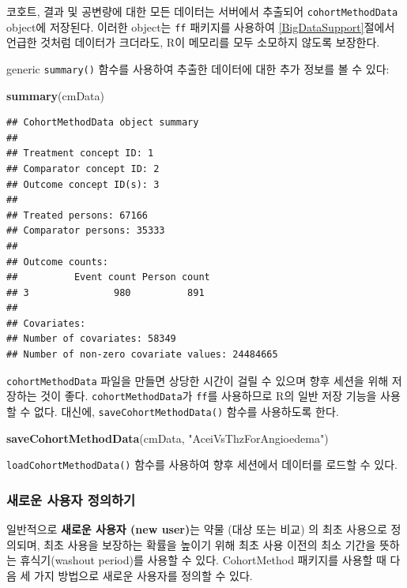 \documentclass[11pt]{book}
\newenvironment{Shaded}{\begin{snugshade}}{\end{snugshade}}
\newcommand{\KeywordTok}[1]{\textcolor[rgb]{0.13,0.29,0.53}{\textbf{#1}}}
\newcommand{\StringTok}[1]{\textcolor[rgb]{0.31,0.60,0.02}{#1}}
\newcommand{\NormalTok}[1]{#1}
\theoremstyle{definition}
\theoremstyle{definition}
\theoremstyle{definition}
\theoremstyle{remark}
\begin{document}
코호트, 결과 및 공변량에 대한 모든 데이터는 서버에서 추출되어
\texttt{cohortMethodData} object에 저장된다. 이러한 object는 \texttt{ff}
패키지를 사용하여 \ref{BigDataSupport}절에서 언급한 것처럼 데이터가
크더라도, R이 메모리를 모두 소모하지 않도록 보장한다.

generic \texttt{summary()} 함수를 사용하여 추출한 데이터에 대한 추가
정보를 볼 수 있다:

\begin{Shaded}
\begin{Highlighting}[]
\KeywordTok{summary}\NormalTok{(cmData)}
\end{Highlighting}
\end{Shaded}

\begin{verbatim}
## CohortMethodData object summary
## 
## Treatment concept ID: 1
## Comparator concept ID: 2
## Outcome concept ID(s): 3
## 
## Treated persons: 67166
## Comparator persons: 35333
## 
## Outcome counts:
##          Event count Person count
## 3               980          891
## 
## Covariates:
## Number of covariates: 58349
## Number of non-zero covariate values: 24484665
\end{verbatim}

\texttt{cohortMethodData} 파일을 만들면 상당한 시간이 걸릴 수 있으며
향후 세션을 위해 저장하는 것이 좋다. \texttt{cohortMethodData}가
\texttt{ff}를 사용하므로 R의 일반 저장 기능을 사용할 수 없다. 대신에,
\texttt{saveCohortMethodData()} 함수를 사용하도록 한다.

\begin{Shaded}
\begin{Highlighting}[]
\KeywordTok{saveCohortMethodData}\NormalTok{(cmData, }\StringTok{"AceiVsThzForAngioedema"}\NormalTok{)}
\end{Highlighting}
\end{Shaded}

\texttt{loadCohortMethodData()} 함수를 사용하여 향후 세션에서 데이터를
로드할 수 있다.

\subsubsection*{새로운 사용자 정의하기}\label{--}

일반적으로 \textbf{새로운 사용자 (new user)}는 약물 (대상 또는 비교) 의
최초 사용으로 정의되며, 최초 사용을 보장하는 확률을 높이기 위해 최초
사용 이전의 최소 기간을 뜻하는 휴식기(washout period)를 사용할 수 있다.
CohortMethod 패키지를 사용할 때 다음 세 가지 방법으로 새로운 사용자를
정의할 수 있다.
\end{document}

